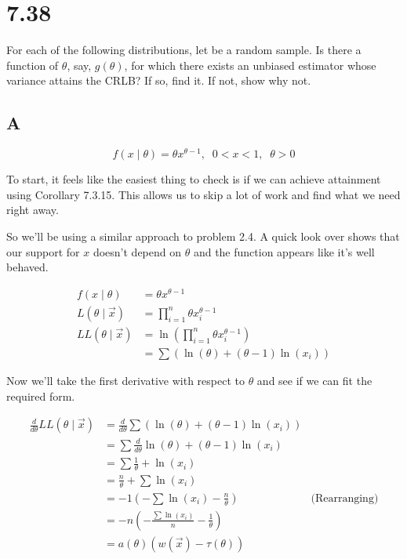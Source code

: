 \section*{7.38}

For each of the following distributions, let \rs be a random sample. Is there a function of $\theta$, say, $g(\theta)$, for which there exists an unbiased estimator whose variance attains the CRLB? If so, find it. If not, show why not.

\subsection*{A}

\[
	f(x \mid \theta) = \theta x^{\theta - 1}, \;\; 0 < x < 1, \;\; \theta > 0
\]

To start, it feels like the easiest thing to check is if we can achieve attainment using Corollary 7.3.15. This allows us to skip a lot of work and find what we need right away. 

So we'll be using a similar approach to problem 2.4. A quick look over shows that our support for $x$ doesn't depend on $\theta$ and the function appears like it's well behaved.

\begin{align*}
	f(x \mid \theta) &= \theta x^{\theta - 1} \\
	L(\theta \mid \vec{x}) &= \prod_{i=1}^n \theta x_i^{\theta - 1} \\
	LL(\theta \mid \vec{x}) &= \ln\left(  \prod_{i=1}^n \theta x_i^{\theta - 1}  \right) \\
	&= \sum \left( \ln(\theta) + (\theta - 1)\ln(x_i) \right)
\end{align*}

Now we'll take the first derivative with respect to $\theta$ and see if we can fit the required form.

\begin{align*}
	\frac{d}{d\theta} LL(\theta \mid \vec{x}) &= \frac{d}{d\theta} \sum \left( \ln(\theta) + (\theta - 1)\ln(x_i) \right) \\
	&= \sum \frac{d}{d\theta} \ln(\theta) + (\theta - 1)\ln(x_i) \\
	&= \sum \frac{1}{\theta} + \ln(x_i) \\
	&= \frac{n}{\theta} + \sum \ln(x_i) \\
	&= -1\left( -\sum \ln(x_i) - \frac{n}{\theta} \right) & \text{(Rearranging)} \\
	&= -n\left( -\frac{\sum \ln(x_i)}{n} - \frac{1}{\theta} \right) \\
	&= a(\theta) \left( w(\vec{x}) - \tau(\theta) \right)
\end{align*}

